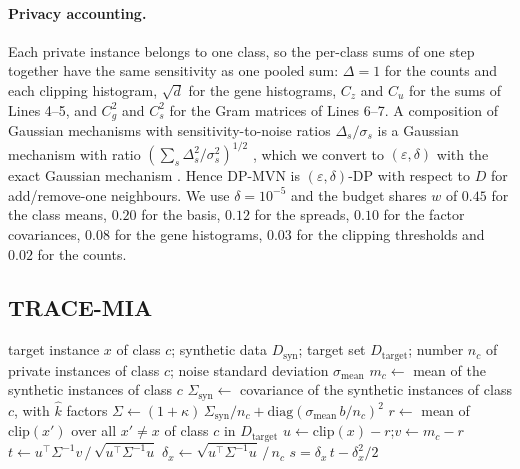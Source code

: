 \documentclass{article}
\newcommand{\dpmvn}{DP-MVN}
\newcommand{\ours}{TRACE-MIA}
\begin{document}
\paragraph{Privacy accounting.}
Each private instance belongs to one class, so the per-class sums of one step together have the same sensitivity as one pooled sum: $\Delta = 1$ for the counts and each clipping histogram, $\sqrt d$ for the gene histograms, $C_z$ and $C_u$ for the sums of Lines 4--5, and $C_g^2$ and $C_s^2$ for the Gram matrices of Lines 6--7. A composition of Gaussian mechanisms with sensitivity-to-noise ratios $\Delta_s/\sigma_s$ is a Gaussian mechanism with ratio $(\sum_s \Delta_s^2/\sigma_s^2)^{1/2}$ \cite{dong2022gaussian}, which we convert to $(\varepsilon,\delta)$ with the exact Gaussian mechanism \cite{balle2018improving}. Hence \dpmvn{} is $(\varepsilon,\delta)$-DP with respect to $D$ for add/remove-one neighbours. We use $\delta=10^{-5}$ and the budget shares $w$ of $0.45$ for the class means, $0.20$ for the basis, $0.12$ for the spreads, $0.10$ for the factor covariances, $0.08$ for the gene histograms, $0.03$ for the clipping thresholds and $0.02$ for the counts.

\subsection{\ours{}}

\begin{algorithm}[h]
\caption{\ours{}: Membership inference for a single target instance}
\label{alg:trace-mia}
\begin{algorithmic}[1]
\Require target instance $x$ of class $c$; synthetic data $D_\text{syn}$; target set $D_\mathrm{target}$; number $n_c$ of private instances of class $c$; noise standard deviation $\sigma_\mathrm{mean}$
\State $m_c \gets$ mean of the synthetic instances of class $c$
\State $\Sigma_\mathrm{syn} \gets$ covariance of the synthetic instances of class $c$, with $\hat k$ factors
\State $\Sigma \gets (1+\kappa)\,\Sigma_\mathrm{syn}/n_c + \mathrm{diag}(\sigma_\mathrm{mean}\, b / n_c)^2$
\State $r \gets$ mean of $\mathrm{clip}(x')$ over all $x' \ne x$ of class $c$ in $D_\mathrm{target}$
\State $u \gets \mathrm{clip}(x) - r$;\quad $v \gets m_c - r$
\State $t \gets u^\top \Sigma^{-1} v \,/\, \sqrt{u^\top \Sigma^{-1} u}$
\State $\delta_x \gets \sqrt{u^\top \Sigma^{-1} u}\,/\,n_c$
\State \Return $s = \delta_x\, t - \delta_x^2/2$
\end{algorithmic}
\end{algorithm}
\end{document}
